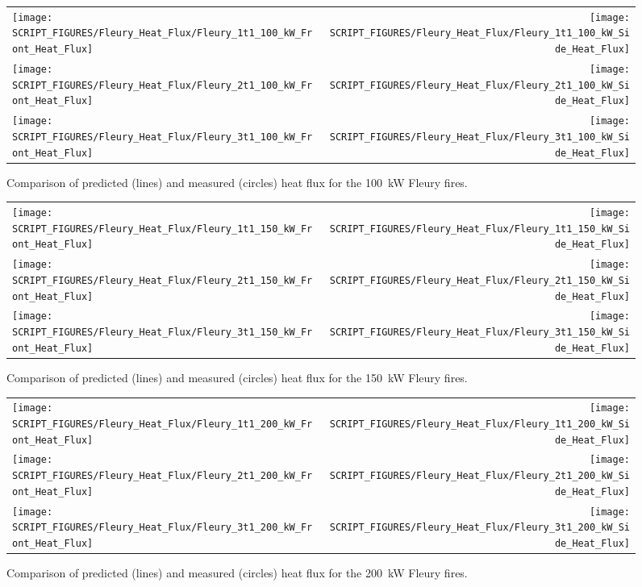 \begin{figure}[p]
\begin{tabular*}{\textwidth}{l@{\extracolsep{\fill}}r}
\texttt{[image: SCRIPT\_FIGURES/Fleury\_Heat\_Flux/Fleury\_1t1\_100\_kW\_Front\_Heat\_Flux]} &
\texttt{[image: SCRIPT\_FIGURES/Fleury\_Heat\_Flux/Fleury\_1t1\_100\_kW\_Side\_Heat\_Flux]} \\
\texttt{[image: SCRIPT\_FIGURES/Fleury\_Heat\_Flux/Fleury\_2t1\_100\_kW\_Front\_Heat\_Flux]} &
\texttt{[image: SCRIPT\_FIGURES/Fleury\_Heat\_Flux/Fleury\_2t1\_100\_kW\_Side\_Heat\_Flux]} \\
\texttt{[image: SCRIPT\_FIGURES/Fleury\_Heat\_Flux/Fleury\_3t1\_100\_kW\_Front\_Heat\_Flux]} &
\texttt{[image: SCRIPT\_FIGURES/Fleury\_Heat\_Flux/Fleury\_3t1\_100\_kW\_Side\_Heat\_Flux]}
\end{tabular*}
\label{Fleury_Heat_Flux_100_kW}
\caption[Fleury Heat Flux, 100 kW fires]
{Comparison of predicted (lines) and measured (circles) heat flux for the 100~kW Fleury fires.}
\end{figure}

\begin{figure}[p]
\begin{tabular*}{\textwidth}{l@{\extracolsep{\fill}}r}
\texttt{[image: SCRIPT\_FIGURES/Fleury\_Heat\_Flux/Fleury\_1t1\_150\_kW\_Front\_Heat\_Flux]} &
\texttt{[image: SCRIPT\_FIGURES/Fleury\_Heat\_Flux/Fleury\_1t1\_150\_kW\_Side\_Heat\_Flux]} \\
\texttt{[image: SCRIPT\_FIGURES/Fleury\_Heat\_Flux/Fleury\_2t1\_150\_kW\_Front\_Heat\_Flux]} &
\texttt{[image: SCRIPT\_FIGURES/Fleury\_Heat\_Flux/Fleury\_2t1\_150\_kW\_Side\_Heat\_Flux]} \\
\texttt{[image: SCRIPT\_FIGURES/Fleury\_Heat\_Flux/Fleury\_3t1\_150\_kW\_Front\_Heat\_Flux]} &
\texttt{[image: SCRIPT\_FIGURES/Fleury\_Heat\_Flux/Fleury\_3t1\_150\_kW\_Side\_Heat\_Flux]}
\end{tabular*}
\label{Fleury_Heat_Flux_150_kW}
\caption[Fleury Heat Flux, 150 kW fires]
{Comparison of predicted (lines) and measured (circles) heat flux for the 150~kW Fleury fires.}
\end{figure}

\begin{figure}[p]
\begin{tabular*}{\textwidth}{l@{\extracolsep{\fill}}r}
\texttt{[image: SCRIPT\_FIGURES/Fleury\_Heat\_Flux/Fleury\_1t1\_200\_kW\_Front\_Heat\_Flux]} &
\texttt{[image: SCRIPT\_FIGURES/Fleury\_Heat\_Flux/Fleury\_1t1\_200\_kW\_Side\_Heat\_Flux]} \\
\texttt{[image: SCRIPT\_FIGURES/Fleury\_Heat\_Flux/Fleury\_2t1\_200\_kW\_Front\_Heat\_Flux]} &
\texttt{[image: SCRIPT\_FIGURES/Fleury\_Heat\_Flux/Fleury\_2t1\_200\_kW\_Side\_Heat\_Flux]} \\
\texttt{[image: SCRIPT\_FIGURES/Fleury\_Heat\_Flux/Fleury\_3t1\_200\_kW\_Front\_Heat\_Flux]} &
\texttt{[image: SCRIPT\_FIGURES/Fleury\_Heat\_Flux/Fleury\_3t1\_200\_kW\_Side\_Heat\_Flux]}
\end{tabular*}
\label{Fleury_Heat_Flux_200_kW}
\caption[Fleury Heat Flux, 200 kW fires]
{Comparison of predicted (lines) and measured (circles) heat flux for the 200~kW Fleury fires.}
\end{figure}

